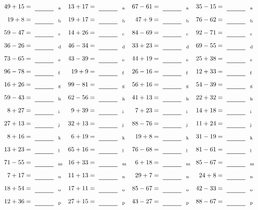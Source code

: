 \documentclass
[
  draft    = true,
  fontsize = 11pt,
  parskip  = half-
]
{scrartcl}
\begin{document}
\clearpage
\begin{align*}
    \pline{49+15}&=\rline{a}
  & \pline{13+17}&=\rline{a}
  & \pline{67-61}&=\rline{a}
  & \pline{35-15}&=\rline{a} \\[1ex]
    \pline{19+8}&=\rline{b}
  & \pline{19+17}&=\rline{b}
  & \pline{47+9}&=\rline{b}
  & \pline{76-62}&=\rline{b} \\[1ex]
    \pline{59-47}&=\rline{c}
  & \pline{14+26}&=\rline{c}
  & \pline{84-69}&=\rline{c}
  & \pline{92-71}&=\rline{c} \\[1ex]
    \pline{36-26}&=\rline{d}
  & \pline{46-34}&=\rline{d}
  & \pline{33+23}&=\rline{d}
  & \pline{69-55}&=\rline{d} \\[1ex]
    \pline{73-65}&=\rline{e}
  & \pline{43-39}&=\rline{e}
  & \pline{44+19}&=\rline{e}
  & \pline{25+38}&=\rline{e} \\[1ex]
    \pline{96-78}&=\rline{f}
  & \pline{19+9}&=\rline{f}
  & \pline{26-16}&=\rline{f}
  & \pline{12+33}&=\rline{f} \\[1ex]
    \pline{16+26}&=\rline{g}
  & \pline{99-81}&=\rline{g}
  & \pline{56+16}&=\rline{g}
  & \pline{54-39}&=\rline{g} \\[1ex]
    \pline{59-43}&=\rline{h}
  & \pline{62-56}&=\rline{h}
  & \pline{41+13}&=\rline{h}
  & \pline{22+32}&=\rline{h} \\[1ex]
    \pline{8+27}&=\rline{i}
  & \pline{9+39}&=\rline{i}
  & \pline{7+23}&=\rline{i}
  & \pline{14+18}&=\rline{i} \\[1ex]
    \pline{27+13}&=\rline{j}
  & \pline{32+13}&=\rline{j}
  & \pline{88-76}&=\rline{j}
  & \pline{11+24}&=\rline{j} \\[1ex]
    \pline{8+16}&=\rline{k}
  & \pline{6+19}&=\rline{k}
  & \pline{19+8}&=\rline{k}
  & \pline{31-19}&=\rline{k} \\[1ex]
    \pline{13+23}&=\rline{l}
  & \pline{65+16}&=\rline{l}
  & \pline{76-68}&=\rline{l}
  & \pline{81-61}&=\rline{l} \\[1ex]
    \pline{71-55}&=\rline{m}
  & \pline{16+33}&=\rline{m}
  & \pline{6+18}&=\rline{m}
  & \pline{85-67}&=\rline{m} \\[1ex]
    \pline{7+17}&=\rline{n}
  & \pline{11+13}&=\rline{n}
  & \pline{29+7}&=\rline{n}
  & \pline{24+8}&=\rline{n} \\[1ex]
    \pline{18+54}&=\rline{o}
  & \pline{17+11}&=\rline{o}
  & \pline{85-67}&=\rline{o}
  & \pline{42-33}&=\rline{o} \\[1ex]
    \pline{12+36}&=\rline{p}
  & \pline{27+15}&=\rline{p}
  & \pline{43-27}&=\rline{p}
  & \pline{88-67}&=\rline{p}
\end{align*}
\end{document}

